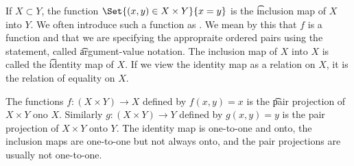 
If $X \subset Y$, the function $\Set{(x, y) \in X \times Y}{x = y}$ is the \t{inclusion map} of $X$ into $Y$.
We often introduce such a function as .
We mean by this that $f$ is a function and that we are specifying the appropraite ordered pairs using the statement, called \t{argument-value notation}.
The inclusion map of $X$ into $X$ is called the \t{identity map} of $X$.
If we view the identity map as a relation on $X$, it is the relation of equality on $X$.

The functions $f: (X \times Y) \to X$ defined by $f(x, y) = x$ is the \t{pair projection} of $X \times Y$ ono $X$.
Similarly $g: (X \times Y) \to Y$ defined by $g(x, y) = y$ is the pair projection of $X \times Y$ onto $Y$.
The identity map is one-to-one and onto, the inclusion maps are one-to-one but not always onto, and the pair projections are usually not one-to-one.
